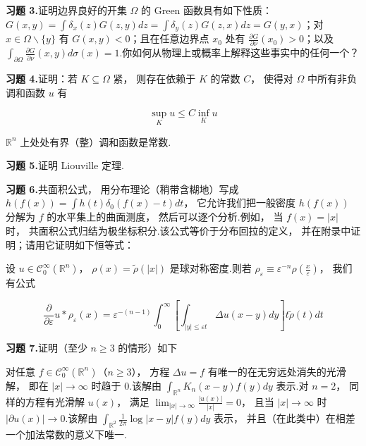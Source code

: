 \noindent\textbf{习题 3.}\quad 证明边界良好的开集 $\Omega$ 的 Green 函数具有如下性质：$G(x, y) = \int\delta_{x}(z)G(z, y)dz = \int\delta_{y}(z)G(z, x)dz = G(y, x)$；对 $x \in \Omega\backslash\{y\}$ 有 $G(x, y) < 0$；且在任意边界点 $x_{0}$ 处有 $\frac{\partial G}{\partial\nu}(x_{0}) > 0$；以及 $\int_{\partial\Omega}\frac{\partial G}{\partial\nu}(x, y)d\sigma(x) = 1$.你如何从物理上或概率上解释这些事实中的任何一个？

\noindent\textbf{习题 4.} 证明：若 $K \subseteq \Omega$ 紧， 则存在依赖于 $K$ 的常数 $C$， 使得对 $\Omega$ 中所有非负调和函数 $u$ 有

\[
\sup_{K}u \leq C\inf_{K}u
\]

\begin{theorem}[Liouville 定理]\label{thm:c4-2.8}
$\mathbb{R}^{n}$ 上处处有界（整）调和函数是常数.
\end{theorem}

\noindent\textbf{习题 5.}\quad 证明 Liouville 定理.

\noindent\textbf{习题 6.}\quad 共面积公式， 用分布理论（稍带含糊地）写成 $h(f(x)) = \int h(t)\delta_{0}(f(x)-t)dt$， 它允许我们把一般密度 $h(f(x))$ 分解为 $f$ 的水平集上的曲面测度， 然后可以逐个分析.例如， 当 $f(x) = |x|$ 时， 共面积公式归结为极坐标积分.该公式等价于分布回拉的定义， 并在附录中证明；请用它证明如下恒等式：

设 $u \in \mathcal{C}_{0}^{\infty}(\mathbb{R}^{n})$， $\rho(x) = \tilde{\rho}(|x|)$ 是球对称密度.则若 $\rho_{\varepsilon} \equiv \varepsilon^{-n}\rho(\frac{x}{\varepsilon})$， 我们有公式

\[
\frac{\partial}{\partial\varepsilon}u*\rho_{\varepsilon}(x) = \varepsilon^{-(n-1)}\int_{0}^{\infty}\left[\int_{|y|\leq\varepsilon t}\Delta u(x-y)dy\right]t\tilde{\rho}(t)dt
\]

\noindent\textbf{习题 7.}\quad 证明（至少 $n \geq 3$ 的情形）如下

\begin{proposition}\label{prop:c4-2.9}
对任意 $f \in \mathcal{C}_{0}^{\infty}(\mathbb{R}^{n})$（$n \geq 3$）， 方程 $\Delta u = f$ 有唯一的在无穷远处消失的光滑解， 即在 $|x| \to \infty$ 时趋于 0.该解由 $\int_{\mathbb{R}^{n}}K_{n}(x-y)f(y)dy$ 表示.对 $n = 2$， 同样的方程有光滑解 $u(x)$， 满足 $\lim_{|x|\to\infty}\frac{|u(x)|}{|x|} = 0$， 且当 $|x| \to \infty$ 时 $|\partial u(x)| \to 0$.该解由 $\int_{\mathbb{R}^{2}}\frac{1}{2\pi}\log|x-y|f(y)dy$ 表示， 并且（在此类中）在相差一个加法常数的意义下唯一.
\end{proposition}

